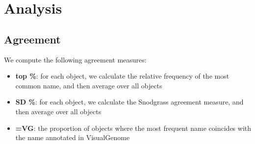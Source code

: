 \documentclass[11pt,a4paper]{article}
\begin{document}
\section{Analysis}

\subsection{Agreement}

We compute the following agreement measures:

\begin{itemize}
\item \textbf{top \%}: for each object, we calculate the relative frequency of the most common name, and then average over all objects
\item \textbf{SD \%}: for each object, we calculate the Snodgrass agreement measure, and then average over all objects
\item \textbf{=VG}: the proportion of objects where the most frequent name coincides with the name annotated in VisualGenome
\end{itemize}
\end{document}
